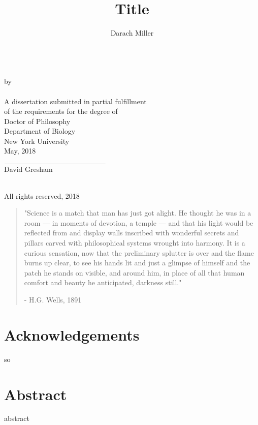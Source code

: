 \documentclass[12pt,letterpaper]{memoir}
\title{Title}
\author{Darach Miller}
\makeatletter
\def\makemytitle{
  \newpage
  \begin{center}
  \@title\\
\vfill
  by\\
\vfill
  \@author\\
\vfill
  A dissertation submitted in partial fulfillment \\
  of the requirements for the degree of \\
  Doctor of Philosophy \\
  Department of Biology \\
  New York University \\
\vfill
  \monthz, \yearz\\
  \end{center}
\vfill
  \begin{flushright}
  $\rule{5cm}{0.01mm}$\\
  David Gresham
  \end{flushright}
  \pagebreak
  \begin{centering}
  \textcopyright \hspace{0.2em} \@author \\
  All rights reserved, \yearz \\
  \end{centering}
  \pagebreak
}
\def\monthz{May}
\def\yearz{2018}
\makeatother
\begin{document}
\DoubleSpacing
\frontmatter
\pagestyle{empty}

\makemytitle

\begin{quote}
\SingleSpace
"Science is a match that man has just got alight. He thought he 
was in a room --- in moments of devotion, a temple --- and 
that his light would be reflected from and display walls inscribed 
with wonderful secrets and pillars carved with philosophical 
systems wrought into harmony. 
\vfill
It is a curious sensation, now that the preliminary splutter is 
over and the flame burns up clear, to see his hands lit and just 
a glimpse of himself and the patch he stands on visible, and 
around him, in place of all that human comfort and beauty he 
anticipated, darkness still."

\hfill - H.G. Wells, 1891
\end{quote}

\newpage

\section*{Acknowledgements}

so

\newpage
\pagestyle{plain}

\section*{Abstract}

abstract

\newpage

\tableofcontents*

\mainmatter









\end{document}
